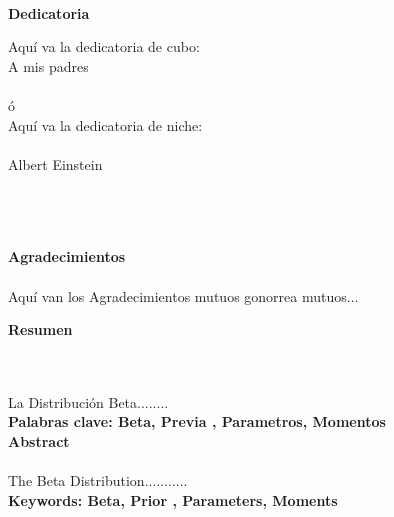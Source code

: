 \newpage

\thispagestyle{empty} \textbf{}\normalsize
\\\\\\
\textbf{Dedicatoria}\\[4.0cm]

\begin{flushright}
\begin{minipage}{8cm}
\noindent
\small
Aqu\'{i} va la dedicatoria de cubo:\\[1.0cm]
A mis padres\\[1.0cm]\\
\'{o}\\[1.0cm]
Aqu\'{i} va la dedicatoria de niche:\\\\
Albert Einstein\\
\end{minipage}
\end{flushright}

\newpage{\pagestyle{empty}\cleardoublepage}

\newpage

\thispagestyle{empty} \textbf{}\normalsize
\\\\\\
\textbf{\LARGE Agradecimientos}\\\\

Aqu\'{i} van los Agradecimientos mutuos gonorrea mutuos...

\newpage{\pagestyle{empty}\cleardoublepage}

\newpage

\textbf{\LARGE Resumen}
\\\\
La Distribuci\'{o}n Beta........\\[0.5cm]

\textbf{\small Palabras clave: Beta, Previa , Parametros, Momentos}\\[1cm]

\textbf{\LARGE Abstract}\\\\
The Beta Distribution...........\\[0.5cm]

\textbf{\small Keywords: Beta, Prior , Parameters, Moments}\\

\newpage{\pagestyle{empty}\cleardoublepage}